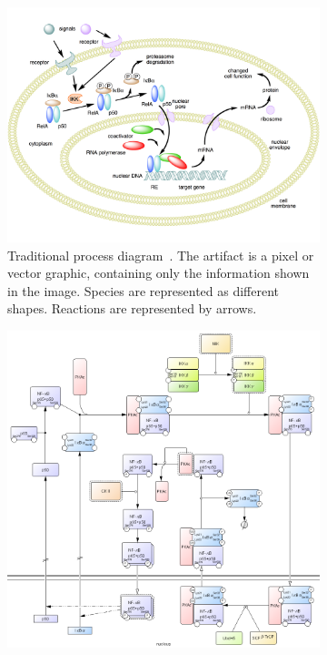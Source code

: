 \documentclass[
	fontsize=10pt, %
	twoside=true, %
	secnumdepth=1, %
  toc=indentunnumbered %
]{kaobook}
\begin{document}
\begin{figure}[h]
  \centering
  \begin{subfigure}{0.4\textwidth}
    \centering
    \includegraphics[width=\textwidth]{NF-kB-mechanism/handdrawn.png}
    \caption{Traditional process
      diagram~\cite{onenglishwikipedia_NFkBMechanismAction_2007}. The artifact
      is a pixel or vector graphic, containing only the information shown in the
      image. Species are represented as different shapes. Reactions are
      represented by arrows.}
    \label{fig:process-diagram-old-vs-new:handdrawn}
  \end{subfigure}
  \hspace{1em}
  \begin{subfigure}{0.4\textwidth}
    \centering
    \includegraphics[width=\textwidth]{NF-kB-mechanism/CellDesigner.png}

\end{subfigure}
\end{figure}
\end{document}
